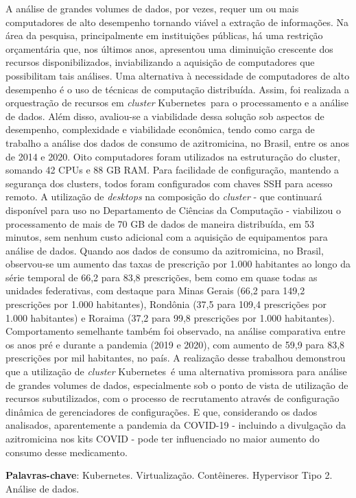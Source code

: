 
\begin{resumo}

    A análise de grandes volumes de dados, por vezes, requer um ou mais computadores de alto desempenho tornando viável a extração de informações. Na área da pesquisa, principalmente em instituições públicas, há uma restrição orçamentária que, nos últimos anos, apresentou uma diminuição crescente dos recursos disponibilizados, inviabilizando a aquisição de computadores que possibilitam tais análises. Uma alternativa à necessidade de computadores de alto desempenho é o uso de técnicas de computação distribuída. Assim, foi realizada a orquestração de recursos em \emph{cluster} Kubernetes\textregistered\ para o processamento e a análise de dados. Além disso, avaliou-se a viabilidade dessa solução sob aspectos de desempenho, complexidade e viabilidade econômica, tendo como carga de trabalho a análise dos dados de consumo de azitromicina, no Brasil, entre os anos de 2014 e 2020.  Oito computadores foram utilizados na estruturação do cluster, somando 42 CPUs e 88 GB RAM. Para facilidade de configuração, mantendo a segurança dos clusters, todos foram configurados com chaves SSH para acesso remoto. A utilização de \emph{desktops} na composição do \emph{cluster} - que continuará disponível para uso no Departamento de Ciências da Computação - viabilizou o processamento de mais de 70 GB de dados de maneira distribuída, em 53 minutos, sem nenhum custo adicional com a aquisição de equipamentos para análise de dados. Quando aos dados de consumo da azitromicina, no Brasil, observou-se um aumento das taxas de prescrição por 1.000 habitantes ao longo da série temporal de 66,2 para 83,8 prescrições, bem como em quase todas as unidades federativas, com destaque para Minas Gerais (66,2 para 149,2 prescrições por 1.000 habitantes), Rondônia (37,5 para 109,4 prescrições por 1.000 habitantes) e Roraima (37,2 para 99,8 prescrições por 1.000 habitantes). Comportamento semelhante também foi observado, na análise comparativa entre os anos pré e durante a pandemia (2019 e 2020), com aumento de 59,9 para 83,8 prescrições por mil habitantes, no país. A realização desse trabalhou demonstrou que a utilização de \emph{cluster} Kubernetes\textregistered\ é uma alternativa promissora para análise de grandes volumes de dados, especialmente sob o ponto de vista de utilização de recursos subutilizados, com o processo de recrutamento através de configuração dinâmica de gerenciadores de configurações. E que, considerando os dados analisados, aparentemente a pandemia da COVID-19 - incluindo a divulgação da azitromicina nos kits COVID - pode ter influenciado no maior aumento do consumo desse medicamento.


    \textbf{Palavras-chave}: Kubernetes\textregistered. Virtualização. Contêineres. Hypervisor Tipo 2. Análise de dados.
\end{resumo}


